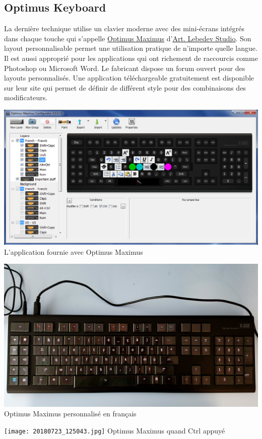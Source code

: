 \documentclass[12pt,a4paper]{article}
\begin{document}
\subsection{Optimus Keyboard}
La dernière technique utilise un clavier moderne avec des mini-écrans intégrés dans chaque touche qui s'appelle \href{https://www.artlebedev.com/optimus/maximus/}{Optimus Maximus} d'\href{https://www.artlebedev.com/}{Art. Lebedev Studio}. Son layout personnalisable permet une utilisation pratique de n'importe quelle langue. Il est aussi approprié pour les applications qui ont richement de raccourcis comme Photoshop ou Microsoft Word. Le fabricant dispose un forum ouvert pour des layouts personnalisés. Une application téléchargeable gratuitement est disponible sur leur site qui permet de définir de différent style pour des combinaisons des modificateurs.
\begin{center}
	\includegraphics[width=1\linewidth]{Optimus.jpg}
	L'application fournie avec Optimus Maximus
\end{center}
\begin{center}
	\includegraphics[width=1\linewidth]{20180723_125036.jpg}
	Optimus Maximus personnalisé en français
\end{center}
\begin{center}
	\texttt{[image: 20180723\_125043.jpg]}
	Optimus Maximus quand Ctrl appuyé
\end{center}
\end{document}

